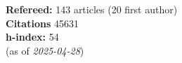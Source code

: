 \textbf{Refereed:} 143 articles (20 first author)\\\textbf{Citations} 45631\\\textbf{h-index:} 54\\(as of \textit{2025-04-28})